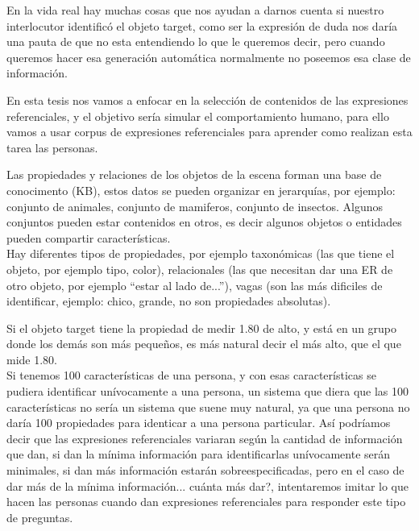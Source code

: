 En la vida real hay muchas cosas que nos ayudan a darnos cuenta si nuestro interlocutor identific\'o el objeto target, como ser la expresi\'on de duda nos dar\'ia una pauta de que no esta entendiendo lo que le queremos decir, pero cuando queremos hacer esa generaci\'on autom\'atica normalmente no poseemos esa clase de informaci\'on.

En esta tesis nos vamos a enfocar en la selecci\'on de contenidos de las expresiones referenciales, y el objetivo ser\'ia simular el comportamiento humano, para ello vamos a usar corpus de expresiones referenciales para aprender como realizan esta tarea las personas.
 
Las propiedades y relaciones de los objetos de la escena forman una base de conocimento (KB), estos datos se pueden organizar en jerarqu\'ias, por ejemplo: conjunto de animales, conjunto de mamiferos, conjunto de insectos. Algunos conjuntos pueden estar contenidos en otros, es decir algunos objetos o entidades pueden compartir caracter\'isticas.\\

Hay diferentes tipos de propiedades, por ejemplo taxon\'omicas (las que tiene el objeto, por ejemplo tipo, color), relacionales (las que necesitan dar una ER de otro objeto, por ejemplo ``estar al lado de...''), vagas (son las m\'as dificiles de identificar, ejemplo: chico, grande, no son propiedades absolutas).

Si el objeto target tiene la propiedad de medir 1.80 de alto, y est\'a en un grupo donde los dem\'as son m\'as peque\~nos, es m\'as natural decir el m\'as alto, que el que mide 1.80.\\

Si tenemos 100 caracter\'isticas de una persona, y con esas caracter\'isticas se pudiera identificar un\'ivocamente a una persona, un sistema que diera que las 100 caracter\'isticas no ser\'ia un sistema que suene muy natural, ya que una persona no dar\'ia 100 propiedades para identicar a una persona particular. As\'i podr\'iamos decir que las expresiones referenciales variaran seg\'un la cantidad de informaci\'on que dan, si dan la m\'inima informaci\'on para identificarlas un\'ivocamente ser\'an minimales, si dan m\'as informaci\'on estar\'an sobreespecificadas, pero en el caso de dar m\'as de la m\'inima informaci\'on... cu\'anta m\'as dar?, intentaremos imitar lo que hacen las personas cuando dan expresiones referenciales para responder este tipo de preguntas.\\


